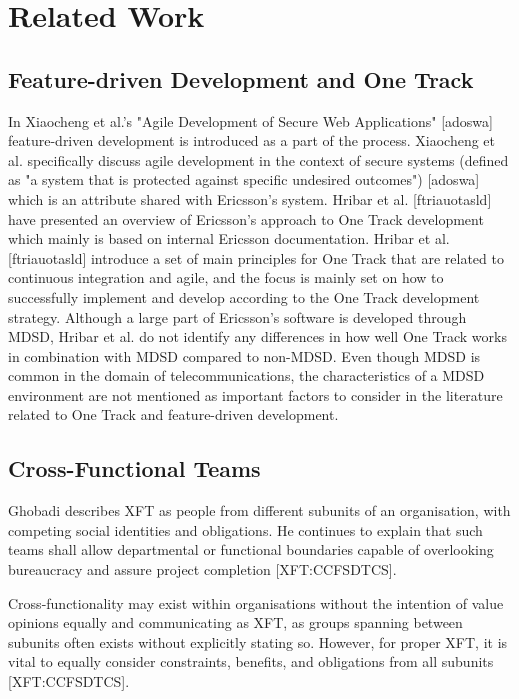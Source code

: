 \documentclass[fina_report_innit.tex]{subfiles}
\begin{document}
\section{Related Work}


\subsection{Feature-driven Development and One Track}
In Xiaocheng et al.'s "Agile Development of Secure Web Applications" [adoswa] feature-driven development is introduced as a part of the process. Xiaocheng et al. specifically discuss agile development in the context of secure systems (defined as "a system that is protected against specific undesired outcomes") [adoswa] which is an attribute shared with Ericsson's system. Hribar et al. [ftriauotasld] have presented an overview of Ericsson's approach to One Track development which mainly is based on internal Ericsson documentation. Hribar et al. [ftriauotasld] introduce a set of main principles for One Track that are related to continuous integration and agile, and the focus is mainly set on how to successfully implement and develop according to the One Track development strategy. Although a large part of Ericsson's software is developed through MDSD, Hribar et al. do not identify any differences in how well One Track works in combination with MDSD compared to non-MDSD. Even though MDSD is common in the domain of telecommunications, the characteristics of a MDSD environment are not mentioned as important factors to consider in the literature related to One Track and feature-driven development. 

\subsection{Cross-Functional Teams}
Ghobadi describes XFT as people from different subunits of an organisation, with competing social identities and obligations. He continues to explain that such teams shall allow departmental or functional boundaries capable of overlooking bureaucracy and assure project completion [XFT:CCFSDTCS].

Cross-functionality may exist within organisations without the intention of value opinions equally and communicating as XFT, as groups spanning between subunits often exists without explicitly stating so. However, for proper XFT, it is vital to equally consider constraints, benefits, and obligations from all subunits [XFT:CCFSDTCS].
\end{document}
